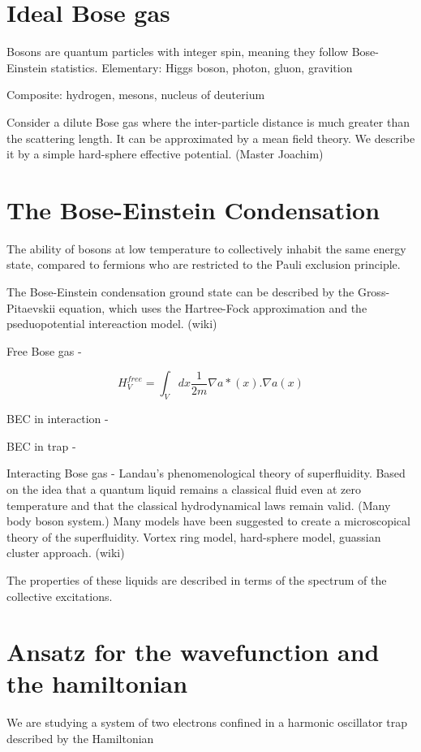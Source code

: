 \section{Ideal Bose gas}
Bosons are quantum particles with integer spin, meaning they follow Bose-Einstein statistics. 
Elementary: Higgs boson, photon, gluon, gravition

Composite: hydrogen, mesons, nucleus of deuterium

Consider a dilute Bose gas where the inter-particle distance is much greater than the scattering length. It can be approximated by a mean field theory. We describe it by a simple hard-sphere effective potential. (Master Joachim)


\section{The Bose-Einstein Condensation}
The ability of bosons at low temperature to collectively inhabit the same energy state, compared to fermions who are restricted to the Pauli exclusion principle.

The Bose-Einstein condensation ground state can be described by the Gross-Pitaevskii equation, which uses the Hartree-Fock approximation and the pseduopotential intereaction model. (wiki) 

Free Bose gas - 

\begin{equation} \label{eq:hamilt_free_bose_gas}
H^{free}_V = \int_V dx \frac{1}{2m} \nabla a*(x). \nabla a(x)
\end{equation}

BEC in interaction - 

BEC in trap - 

Interacting Bose gas - Landau's phenomenological theory of superfluidity. Based on the idea that a quantum liquid remains a classical fluid even at zero temperature  and that the classical hydrodynamical laws remain valid. (Many body boson system.) 
Many models have been suggested to create a microscopical theory of the superfluidity. Vortex ring model, hard-sphere model, guassian cluster approach. (wiki)

The properties of these liquids are described in terms of the spectrum of the collective excitations.

\section{Ansatz for the wavefunction and the hamiltonian}
We are studying a system of two electrons confined in a harmonic oscillator trap described by the Hamiltonian 

